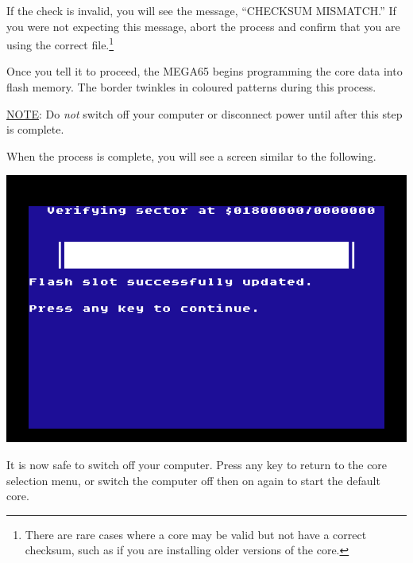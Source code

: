 If the check is invalid, you will see the message, ``CHECKSUM MISMATCH.'' If you were not expecting this message, abort the process and confirm that you are using the correct file.\footnote{There are rare cases where a core may be valid but not have a correct checksum, such as if you are installing older versions of the core.}

Once you tell it to proceed, the MEGA65 begins programming the core data into flash memory. The border twinkles in coloured patterns during this process.

\underline{NOTE}: Do {\em not} switch off your computer or disconnect power until after this step is complete.

\begin{center}
\end{center}

When the process is complete, you will see a screen similar to the following.

\begin{center}
  \includegraphics[width=0.7\linewidth]{images/ss-flashmenu-done.png}
\end{center}

It is now safe to switch off your computer. Press any key to return to the core selection menu, or switch the computer off then on again to start the default core.


